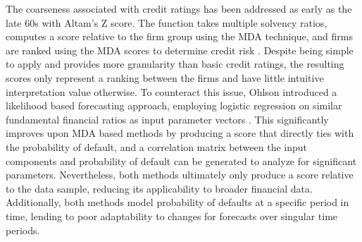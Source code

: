 \documentclass[10pt]{article}
\begin{document}
\begin{multicols*}{2}
The coarseness associated with credit ratings has been addressed as early as the late 60s with Altam's Z score. The function takes multiple solvency ratios, computes a score relative to the firm group using the MDA technique, and firms are ranked using the MDA scores to determine credit risk \citep{altman}. Despite being simple to apply and provides more granularity than basic credit ratings, 
the resulting scores only represent a ranking between the firms and have little intuitive interpretation value otherwise. To counteract this issue, Ohlson introduced a likelihood based forecasting approach, employing logistic regression on similar fundamental financial ratios as input parameter vectors \citep{ohlson}. This significantly improves upon MDA based methods by producing a score that directly ties with 
the probability of default, and a correlation matrix between the input components and probability of default can be generated to analyze for significant parameters. Nevertheless, both methods ultimately only produce a score relative to the data sample, reducing its applicability to broader financial data. Additionally, both methods model probability of defaults at a specific period in time, lending to poor adaptability
to changes for forecasts over singular time periods.


\end{multicols*}
\end{document}
